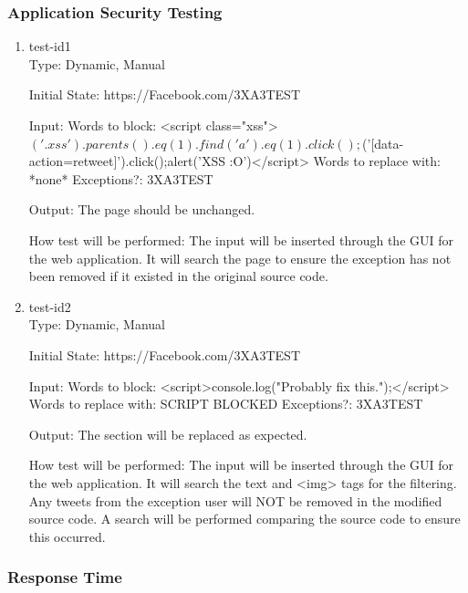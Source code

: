 \documentclass[12pt, titlepage]{article}
\begin{document}
\subsubsection{Application Security Testing}
\begin{enumerate}
\item{test-id1\\}
Type: Dynamic, Manual
					
Initial State: https://Facebook.com/3XA3TEST
					
Input: Words to block: <script class="xss">$('.xss').parents().eq(1).find('a').eq(1).click();$('[data-action=retweet]').click();alert('XSS :O')</script>
Words to replace with: *none*
Exceptions?: 3XA3TEST
					
Output: The page should be unchanged.
					
How test will be performed: The input will be inserted through the GUI for the web application. It will search the page to ensure the exception has not been removed if it existed in the original source code.
					
\item{test-id2\\}
Type: Dynamic, Manual
					
Initial State: https://Facebook.com/3XA3TEST
					
Input:  Words to block: <script>console.log("Probably fix this.");</script>
Words to replace with: SCRIPT BLOCKED
Exceptions?: 3XA3TEST
					
Output: The section will be replaced as expected. 

How test will be performed: The input will be inserted through the GUI for the web application. It will search the text and <img> tags for the filtering. Any tweets from the exception user will NOT be removed in the modified source code. A search will be performed comparing the source code to ensure this occurred.
\end{enumerate}
\subsubsection{Response Time}
		
\end{document}
